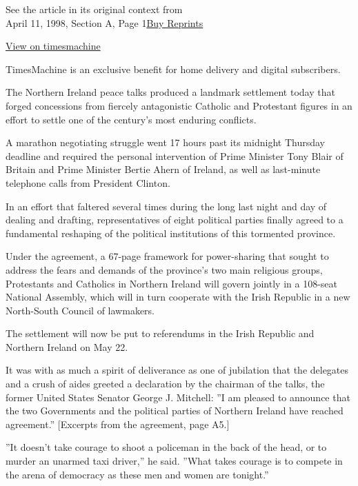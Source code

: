 See the article in its original context from\\
April 11, 1998, Section A, Page
1\href{https://store.nytimes.com/collections/new-york-times-page-reprints?utm_source=nytimes\&utm_medium=article-page\&utm_campaign=reprints}{Buy
Reprints}

\href{http://timesmachine.nytimes.com/timesmachine/1998/04/11/454966.html}{View
on timesmachine}

TimesMachine is an exclusive benefit for home delivery and digital
subscribers.

The Northern Ireland peace talks produced a landmark settlement today
that forged concessions from fiercely antagonistic Catholic and
Protestant figures in an effort to settle one of the century's most
enduring conflicts.

A marathon negotiating struggle went 17 hours past its midnight Thursday
deadline and required the personal intervention of Prime Minister Tony
Blair of Britain and Prime Minister Bertie Ahern of Ireland, as well as
last-minute telephone calls from President Clinton.

In an effort that faltered several times during the long last night and
day of dealing and drafting, representatives of eight political parties
finally agreed to a fundamental reshaping of the political institutions
of this tormented province.

Under the agreement, a 67-page framework for power-sharing that sought
to address the fears and demands of the province's two main religious
groups, Protestants and Catholics in Northern Ireland will govern
jointly in a 108-seat National Assembly, which will in turn cooperate
with the Irish Republic in a new North-South Council of lawmakers.

The settlement will now be put to referendums in the Irish Republic and
Northern Ireland on May 22.

It was with as much a spirit of deliverance as one of jubilation that
the delegates and a crush of aides greeted a declaration by the chairman
of the talks, the former United States Senator George J. Mitchell: ''I
am pleased to announce that the two Governments and the political
parties of Northern Ireland have reached agreement.'' {[}Excerpts from
the agreement, page A5.{]}

''It doesn't take courage to shoot a policeman in the back of the head,
or to murder an unarmed taxi driver,'' he said. ''What takes courage is
to compete in the arena of democracy as these men and women are
tonight.''

